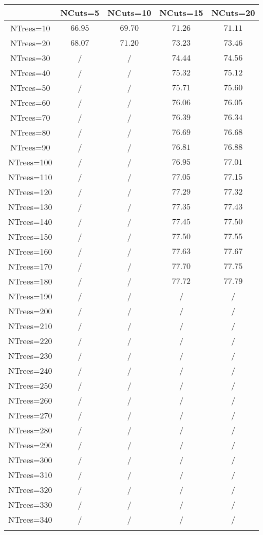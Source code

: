 \centering
\begin{tabular}{ccccc} \toprule\toprule
 & NCuts=5 & NCuts=10 & NCuts=15 & NCuts=20\\\midrule
NTrees=10 & $66.95$ & $69.70$ & $71.26$ & $71.11$\\
NTrees=20 & $68.07$ & $71.20$ & $73.23$ & $73.46$\\
NTrees=30 &  / &  / & $74.44$ & $74.56$\\
NTrees=40 &  / &  / & $75.32$ & $75.12$\\
NTrees=50 &  / &  / & $75.71$ & $75.60$\\
NTrees=60 &  / &  / & $76.06$ & $76.05$\\
NTrees=70 &  / &  / & $76.39$ & $76.34$\\
NTrees=80 &  / &  / & $76.69$ & $76.68$\\
NTrees=90 &  / &  / & $76.81$ & $76.88$\\
NTrees=100 &  / &  / & $76.95$ & $77.01$\\
NTrees=110 &  / &  / & $77.05$ & $77.15$\\
NTrees=120 &  / &  / & $77.29$ & $77.32$\\
NTrees=130 &  / &  / & $77.35$ & $77.43$\\
NTrees=140 &  / &  / & $77.45$ & $77.50$\\
NTrees=150 &  / &  / & $77.50$ & $77.55$\\
NTrees=160 &  / &  / & $77.63$ & $77.67$\\
NTrees=170 &  / &  / & $77.70$ & $77.75$\\
NTrees=180 &  / &  / & $77.72$ & $77.79$\\
NTrees=190 &  / &  / &  / &  /\\
NTrees=200 &  / &  / &  / &  /\\
NTrees=210 &  / &  / &  / &  /\\
NTrees=220 &  / &  / &  / &  /\\
NTrees=230 &  / &  / &  / &  /\\
NTrees=240 &  / &  / &  / &  /\\
NTrees=250 &  / &  / &  / &  /\\
NTrees=260 &  / &  / &  / &  /\\
NTrees=270 &  / &  / &  / &  /\\
NTrees=280 &  / &  / &  / &  /\\
NTrees=290 &  / &  / &  / &  /\\
NTrees=300 &  / &  / &  / &  /\\
NTrees=310 &  / &  / &  / &  /\\
NTrees=320 &  / &  / &  / &  /\\
NTrees=330 &  / &  / &  / &  /\\
NTrees=340 &  / &  / &  / &  /\\
\bottomrule\bottomrule\\
\end{tabular}
